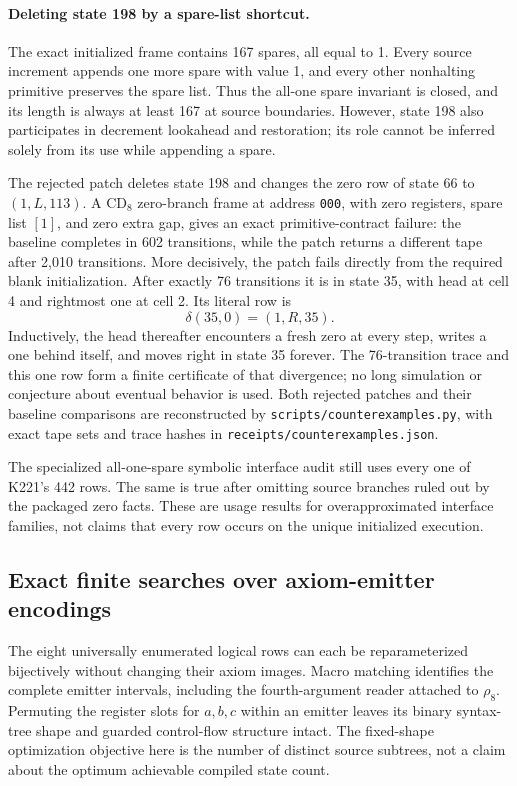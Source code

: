 \paragraph{Deleting state 198 by a spare-list shortcut.}
The exact initialized frame contains 167 spares, all equal to 1.  Every source
increment appends one more spare with value 1, and every other nonhalting
primitive preserves the spare list.  Thus the all-one spare invariant is
closed, and its length is always at least 167 at source boundaries.  However,
state 198 also participates in decrement lookahead and restoration; its role
cannot be inferred solely from its use while appending a spare.

The rejected patch deletes state 198 and changes the zero row of state 66 to
$(1,L,113)$.  A $\mathrm{CD}_8$ zero-branch frame at address \texttt{000},
with zero registers, spare list $[1]$, and zero extra gap, gives an exact
primitive-contract failure: the baseline completes in 602 transitions, while
the patch returns a different tape after 2,010 transitions.  More decisively,
the patch fails directly from the required blank initialization.  After
exactly 76 transitions it is in state 35, with head at cell 4 and rightmost
one at cell 2.  Its literal row is
\[
  \delta(35,0)=(1,R,35).
\]
Inductively, the head thereafter encounters a fresh zero at every step,
writes a one behind itself, and moves right in state 35 forever.  The
76-transition trace and this one row form a finite certificate of that
divergence; no long simulation or conjecture about eventual behavior is used.
Both rejected patches and their baseline comparisons are reconstructed by
\texttt{scripts/counterexamples.py}, with exact tape sets and trace hashes in
\texttt{receipts/counterexamples.json}.

The specialized all-one-spare symbolic interface audit still uses every one
of K221's 442 rows.  The same is true after omitting source branches ruled out
by the packaged zero facts.  These are usage results for overapproximated
interface families, not claims that every row occurs on the unique initialized
execution.

\subsection{Exact finite searches over axiom-emitter encodings}

The eight universally enumerated logical rows can each be reparameterized
bijectively without changing their axiom images.  Macro matching identifies
the complete emitter intervals, including the fourth-argument reader attached
to $\rho_8$.  Permuting the register slots for $a,b,c$ within an emitter leaves
its binary syntax-tree shape and guarded control-flow structure intact.
The fixed-shape optimization objective here is the number of distinct source
subtrees, not a claim about the optimum achievable compiled state count.

